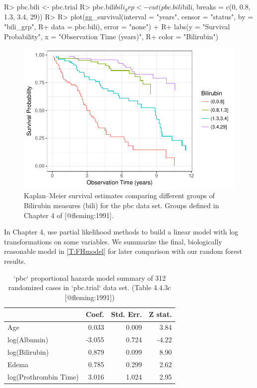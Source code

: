 \documentclass[article]{jss}
\begin{document}
\begin{Schunk}
\begin{Sinput}
R> pbc.bili <- pbc.trial
R> pbc.bili$bili_grp <- cut(pbc.bili$bili, breaks = c(0, 0.8, 1.3, 3.4, 29))
R> 
R> plot(gg_survival(interval = "years", censor = "status", by = "bili_grp",
R+                  data = pbc.bili), error = "none") +
R+   labs(y = "Survival Probability", x = "Observation Time (years)",
R+        color = "Bilirubin")
\end{Sinput}
\begin{figure}[!htb]

{\centering \includegraphics{rfs-gg_survival-bili-1} 

}

\caption[Kaplan--Meier survival estimates comparing different groups of Bilirubin measures (bili) for the pbc data set]{Kaplan--Meier survival estimates comparing different groups of Bilirubin measures (bili) for the pbc data set. Groups defined in Chapter 4 of [@fleming:1991].}\label{fig:gg_survival-bili}
\end{figure}
\end{Schunk}

In Chapter 4,\citep{fleming:1991} use partial likelihood methods to
build a linear model with log transformations on some variables. We
summarize the final, biologically reasonable model in
\autoref{T:FHmodel} for later comparison with our random forest results.

\begin{table}

\caption{\label{tab:xtab}`pbc` proportional hazards model summary of 312 randomized cases in `pbc.trial` data set.  (Table 4.4.3c [@fleming:1991])\label{T:FHmodel}}
\centering
\begin{tabular}[t]{l|r|r|r}
\hline
  & Coef. & Std. Err. & Z stat.\\
\hline
Age & 0.033 & 0.009 & 3.84\\
\hline
log(Albumin) & -3.055 & 0.724 & -4.22\\
\hline
log(Bilirubin) & 0.879 & 0.099 & 8.90\\
\hline
Edema & 0.785 & 0.299 & 2.62\\
\hline
log(Prothrombin Time) & 3.016 & 1.024 & 2.95\\
\hline
\end{tabular}
\end{table}
\end{document}
